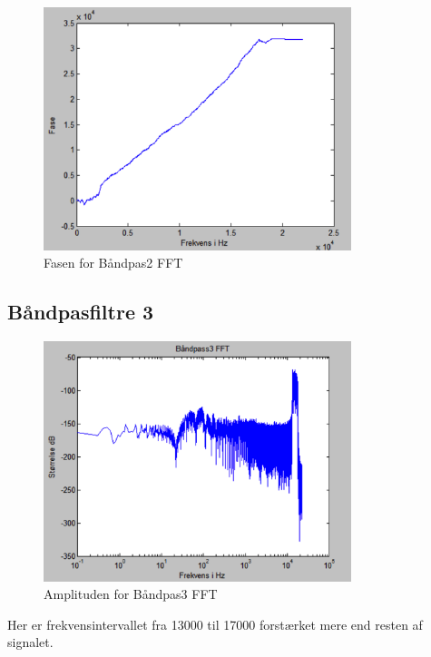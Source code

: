 \begin{figure}[H]
	\centering
	\includegraphics[width=0.8\textwidth]{Figur/Snip20151111_79}
	\caption{Fasen for Båndpas2 FFT}
\end{figure}

\subsection{Båndpasfiltre 3}

\begin{figure}[H]
	\centering
	\includegraphics[width=0.8\textwidth]{Figur/Snip20151111_80}
	\caption{Amplituden for Båndpas3 FFT}
\end{figure}

Her er frekvensintervallet fra 13000 til 17000 forstærket mere end resten af signalet. 

